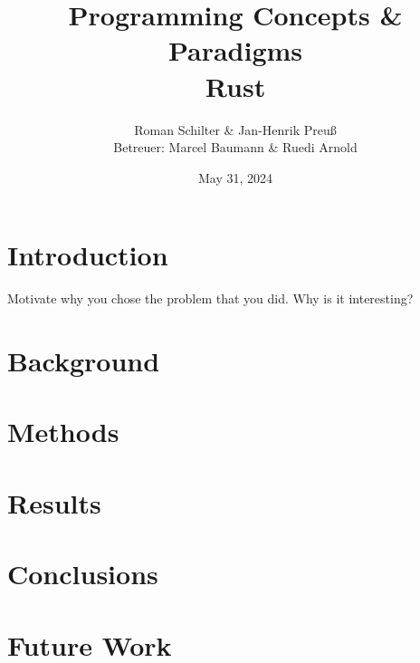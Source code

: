 \documentclass[letterpaper,12pt]{article}
\begin{document}
    \title{Programming Concepts \& Paradigms\\Rust}
    \author{Roman Schilter \& Jan-Henrik Preuß\\[0.4cm]{\small Betreuer: Marcel Baumann \& Ruedi Arnold}}
    \date{May 31, 2024}
    \maketitle

    \begin{abstract}
    \end{abstract}

    \section{Introduction}

    Motivate why you chose the problem that you did. Why is it interesting?

    \blindtext %


    \section{Background}

    \blindtext %

    \section{Methods}

    \section{Results}


    \blindtext


    \section{Conclusions}

    \blindtext

    \section{Future Work}

    \blindtext

\end{document}
